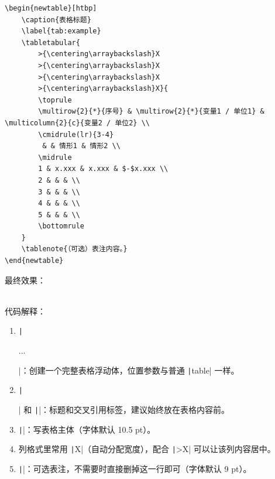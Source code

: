 \documentclass[a4paper,12pt]{article}
\begin{document}
\begin{verbatim}
\begin{newtable}[htbp]
    \caption{表格标题}
    \label{tab:example}
    \tabletabular{
        >{\centering\arraybackslash}X 
        >{\centering\arraybackslash}X 
        >{\centering\arraybackslash}X 
        >{\centering\arraybackslash}X}{
        \toprule
        \multirow{2}{*}{序号} & \multirow{2}{*}{变量1 / 单位1} & \multicolumn{2}{c}{变量2 / 单位2} \\
        \cmidrule(lr){3-4}
         & & 情形1 & 情形2 \\
        \midrule
        1 & x.xxx & x.xxx & $-$x.xxx \\
        2 & & & \\
        3 & & & \\
        4 & & & \\
        5 & & & \\
        \bottomrule
    }
    \tablenote{（可选）表注内容。}
\end{newtable}
\end{verbatim}
最终效果：
\begin{newtable}[htbp]
    \caption{表格标题}
    \label{tab:example}
\end{newtable}
\\代码解释：
\begin{enumerate}
    \item \texttt|\begin{newtable}[htbp] ... \end{newtable}|：创建一个完整表格浮动体，位置参数与普通 \texttt|table| 一样。
    \item \texttt|\caption{...}| 和 \texttt|\label{...}|：标题和交叉引用标签，建议始终放在表格内容前。
    \item \texttt||：写表格主体（字体默认 10.5 pt）。
    \item 列格式里常用 \texttt|X|（自动分配宽度），配合 \texttt|>{\centering\arraybackslash}X| 可以让该列内容居中。
    \item \texttt||：可选表注，不需要时直接删掉这一行即可（字体默认 9 pt）。
\end{enumerate}
\end{document}
